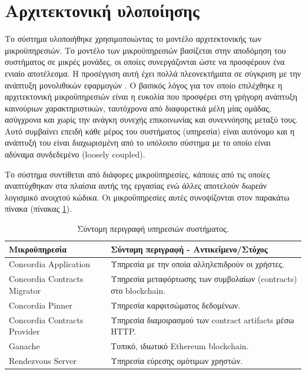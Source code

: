 \section{Αρχιτεκτονική υλοποίησης} \label{section:4-4-implementation-architecture}

Το σύστημα υλοποιήθηκε χρησιμοποιώντας το μοντέλο αρχιτεκτονικής των μικροϋπηρεσιών. Το μοντέλο των μικροϋπηρεσιών βασίζεται στην αποδόμηση του συστήματος σε μικρές μονάδες, οι οποίες συνεργάζονται ώστε να προσφέρουν ένα ενιαίο αποτέλεσμα. Η προσέγγιση αυτή έχει πολλά πλεονεκτήματα σε σύγκριση με την ανάπτυξη μονολιθικών εφαρμογών %
. Ο βασικός λόγος για τον οποίο επιλέχθηκε η αρχιτεκτονική μικροϋπηρεσιών είναι η ευκολία που προσφέρει στη γρήγορη ανάπτυξη καινούριων χαρακτηριστικών, ταυτόχρονα από διαφορετικά μέλη μίας ομάδας, ασύγχρονα και χωρίς την ανάγκη συνεχής επικοινωνίας και συνεννόησης μεταξύ τους. Αυτό συμβαίνει επειδή κάθε μέρος του συστήματος (υπηρεσία) είναι αυτόνομο και η ανάπτυξή του είναι διαχωρισμένη από το υπόλοιπο σύστημα με το οποίο είναι αδύναμα συνδεδεμένο (loosely coupled).

Το σύστημα συντίθεται από διάφορες μικροϋπηρεσίες, κάποιες από τις οποίες αναπτύχθηκαν στα πλαίσια αυτής της εργασίας ενώ άλλες αποτελούν δωρεάν λογισμικό ανοιχτού κώδικα. Οι μικροϋπηρεσίες αυτές συνοψίζονται στον παρακάτω πίνακα (πίνακας \ref{table:4-4-microservice-summary}).

\begin{table}[H]
    \begin{center}
        \begin{tabularx}{\textwidth}{l X}
            \toprule
            \textbf{Μικροϋπηρεσία} & \textbf{Σύντομη περιγραφή - Αντικείμενο/Στόχος} \\
            \midrule
            Concordia Application        & Υπηρεσία με την οποία αλληλεπιδρούν οι χρήστες. \\ [0.5ex]
            Concordia Contracts Migrator & Υπηρεσία μεταφόρτωσης των συμβολαίων (contracts) στο blockchain. \\ [0.5ex]
            Concordia Pinner             & Υπηρεσία καρφιτσώματος δεδομένων. \\ [0.5ex]
            Concordia Contracts Provider & Υπηρεσία διαμοιρασμού των contract artifacts μέσω HTTP. \\ [0.5ex]
            Ganache                      & Τοπικό, ιδιωτικό Ethereum blockchain. \\ [0.5ex]
            Rendezvous Server            & Υπηρεσία εύρεσης ομότιμων χρηστών. \\ [0.5ex]
            \bottomrule
        \end{tabularx}
    \end{center}
    \caption{Σύντομη περιγραφή υπηρεσιών συστήματος.}
    \label{table:4-4-microservice-summary}
\end{table}

